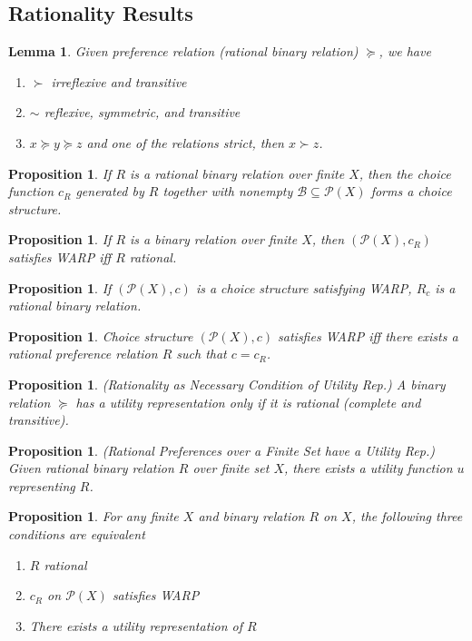 \documentclass[12pt]{article}
\theoremstyle{plain}
\newtheorem{lem}[thm]{Lemma}
\newtheorem{prop}[thm]{Proposition}
\theoremstyle{definition}
\theoremstyle{remark}
\newcommand{\calB}{\mathcal{B}}
\newcommand{\calP}{\mathcal{P}}
\begin{document}
\subsection{Rationality Results}

\begin{lem}
Given preference relation (rational binary relation) $\succeq$, we have
\begin{enumerate}
  \item $\succ$ irreflexive and transitive
  \item $\sim$ reflexive, symmetric, and transitive
  \item $x\succeq y \succeq z$ and one of the relations strict, then
    $x\succ z$.
\end{enumerate}
\end{lem}

\begin{prop}
If $R$ is a rational binary relation over finite $X$, then the choice
function $c_R$ generated by $R$ together with nonempty
$\calB\subseteq\calP(X)$ forms a choice structure.
\end{prop}

\begin{prop}
If $R$ is a binary relation over finite $X$, then $(\calP(X),c_R)$
satisfies WARP iff $R$ rational.
\end{prop}

\begin{prop}
If $(\calP(X),c)$ is a choice structure satisfying WARP, $R_c$ is a
rational binary relation.
\end{prop}

\begin{prop}
Choice structure $(\calP(X),c)$ satisfies WARP iff there exists a
rational preference relation $R$ such that $c=c_R$.
\end{prop}

\begin{prop}
\emph{(Rationality as Necessary Condition of Utility Rep.)}
A binary relation $\succeq$ has a utility representation only if
it is rational (complete and transitive).
\end{prop}

\begin{prop}
\emph{(Rational Preferences over a Finite Set have a Utility Rep.)}
Given rational binary relation $R$ over finite set $X$, there exists a
utility function $u$ representing $R$.
\end{prop}

\begin{prop}
For any finite $X$ and binary relation $R$ on $X$, the following three
conditions are equivalent
\begin{enumerate}
  \item $R$ rational
  \item $c_R$ on $\calP(X)$ satisfies WARP
  \item There exists a utility representation of $R$
\end{enumerate}
\end{prop}
\end{document}
